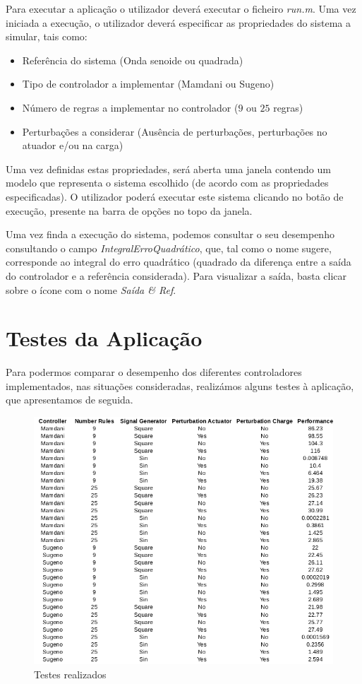 \documentclass{article}
\begin{document}
Para executar a aplicação o utilizador deverá executar o ficheiro \emph{run.m}. Uma vez iniciada a execução, o utilizador deverá especificar as propriedades do sistema a simular, tais como:

\begin{itemize}
\item Referência do sistema (Onda senoide ou quadrada)
\item Tipo de controlador a implementar (Mamdani ou Sugeno)
\item Número de regras a implementar no controlador ($9$ ou $25$ regras)
\item Perturbações a considerar (Ausência de perturbações, perturbações no atuador e/ou na carga)
\end{itemize}

Uma vez definidas estas propriedades, será aberta uma janela contendo um modelo que representa o sistema escolhido (de acordo com as propriedades especificadas). O utilizador poderá executar este sistema clicando no botão de execução, presente na barra de opções no topo da janela.

Uma vez finda a execução do sistema, podemos consultar o seu desempenho consultando o campo \emph{IntegralErroQuadrático}, que, tal como o nome sugere, corresponde ao integral do erro quadrático (quadrado da diferença entre a saída do controlador e a referência considerada). Para visualizar a saída, basta clicar sobre o ícone com o nome \emph{Saída \& Ref}.

\pagebreak

\section{Testes da Aplicação}

Para podermos comparar o desempenho dos diferentes controladores implementados, nas situações consideradas, realizámos alguns testes à aplicação, que apresentamos de seguida.

\begin{figure}[H]
  \centering
      \includegraphics[scale=0.6]{Images/Results.png}
  \caption{Testes realizados}
\end{figure}
\end{document}
